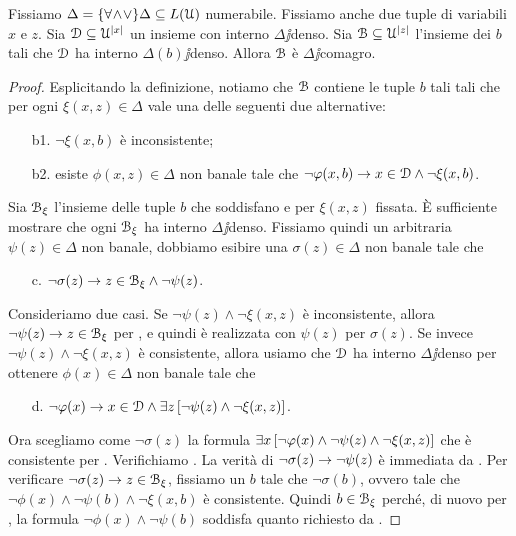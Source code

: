 \begin{lemma}\label{lemmaomissionetipi}
Fissiamo $\Delta=\{\forall\!\wedge\!\vee\}\Delta\subseteq L(\EuScript U)$ numerabile. Fissiamo anche due tuple di variabili $x$ e $z$. Sia $\EuScript D\subseteq\EuScript U^{|x|}$ un insieme con interno $\Delta\jj$denso. Sia $\EuScript B\subseteq\EuScript U^{|z|}$ l'insieme dei $b$ tali che $\EuScript D$ ha interno $\Delta(b)\jj$denso. Allora $\EuScript B$ \`e $\Delta\jj$comagro.
\end{lemma}

\begin{proof} Esplicitando la definizione, notiamo che $\EuScript B$ contiene le tuple $b$ tali tali che per ogni $\xi(x,z)\in\Delta$ vale una delle seguenti due alternative:\nobreak
\begin{itemize}
\item[b1.]  $\neg\xi(x,b)$ \`e inconsistente;
\item[b2.]  esiste $\phi(x,z)\in\Delta$ non banale tale che $\neg\varphi(x,b)\rightarrow x\in\EuScript D\wedge\neg\xi(x,b)$.
\end{itemize}
Sia $\EuScript B_\xi$ l'insieme delle tuple $b$ che soddisfano  e  per $\xi(x,z)$ fissata. \`E sufficiente mostrare che ogni $\EuScript B_\xi$ ha interno $\Delta\jj$denso. Fissiamo quindi un arbitraria $\psi(z)\in\Delta$ non banale, dobbiamo esibire una $\sigma(z)\in\Delta$ non banale tale che
\begin{itemize}
 \item[c.] $\neg\sigma(z)\rightarrow z\in\EuScript B_\xi\wedge\neg\psi(z)$.
\end{itemize}  
Consideriamo due casi. Se $\neg\psi(z)\wedge\neg\xi(x,z)$ \`e inconsistente, allora $\neg\psi(z)\rightarrow z\in\EuScript B_\xi$ per , e quindi  \`e realizzata con $\psi(z)$ per $\sigma(z)$. Se invece $\neg\psi(z)\wedge\neg\xi(x,z)$ \`e consistente, allora usiamo che $\EuScript D$ ha interno $\Delta\jj$denso per ottenere $\phi(x)\in\Delta$ non banale tale che 
\begin{itemize}
\item[d.] $\neg\varphi(x)\rightarrow  x\in\EuScript D\wedge\exists z\,[\neg\psi(z)\wedge\neg\xi(x,z)]$.
\end{itemize} 
Ora scegliamo come $\neg\sigma(z)$ la formula $\exists x\,[\neg\varphi(x)\wedge\neg\psi(z)\wedge\neg\xi(x,z)]$ che \`e consistente per . Verifichiamo . La verit\`a di $\neg\sigma(z)\rightarrow \neg\psi(z)$ \`e immediata da . Per verificare $\neg\sigma(z)\rightarrow z\in\EuScript B_\xi$, fissiamo un $b$ tale che $\neg\sigma(b)$, ovvero tale che $\neg\phi(x)\wedge\neg\psi(b)\wedge\neg\xi(x,b)$ \`e consistente. Quindi $b\in\EuScript B_\xi$ perch\'e, di nuovo per , la formula $\neg\phi(x)\wedge\neg\psi(b)$ soddisfa quanto richiesto da .
\end{proof}

